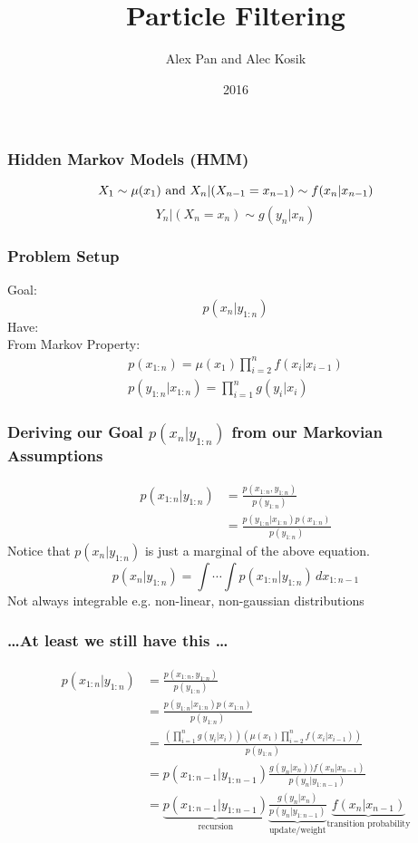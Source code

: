 \documentclass{beamer}
\title{Particle Filtering}
\author{Alex Pan and Alec Kosik}
\institute{Reed College}
\date{2016}
\begin{document}
\frame{\titlepage}

\begin{frame}
\frametitle{Hidden Markov Models (HMM)}
{\large
\begin{equation*}
X_1 \sim \mu (x_1) \textnormal{ and } X_n|(X_{n-1}=x_{n-1}) \sim f(x_n|x_{n-1})
\end{equation*}
\begin{equation*}
Y_n|(X_n = x_n) \sim g(y_n|x_n)
\end{equation*}
}
\end{frame}

\begin{frame}
\frametitle{Problem Setup}
{\Large Goal:}
\begin{equation*}
p(x_{n}|y_{1:n})
\end{equation*}
{\Large Have:} \\[.5cm]
{\large From Markov Property:}
\begin{gather*}
p(x_{1:n}) = \mu(x_1)\prod_{i=2}^{n} f(x_i|x_{i-1})\\
p(y_{1:n}|x_{1:n}) = \prod_{i=1}^{n} g(y_i|x_i)
\end{gather*}
\end{frame}

\begin{frame}
\frametitle{Deriving our Goal $p(x_n|y_{1:n})$ from our Markovian Assumptions}
\begin{align*}
p(x_{1:n}|y_{1:n}) &= \frac{p(x_{1:n}, y_{1:n})}{p(y_{1:n})} \\
&= \frac{p(y_{1:n}|x_{1:n})p(x_{1:n})}{p(y_{1:n})}
\end{align*}
{\large Notice that $p(x_n|y_{1:n})$ is just a marginal of the above equation.}
\begin{equation*}
p(x_n|y_{1:n}) = \int \cdots \int p(x_{1:n}|y_{1:n}) \,dx_{1:n-1}
\end{equation*}
{\large Not always integrable e.g. non-linear, non-gaussian distributions}
\end{frame}

\begin{frame}
\frametitle{\dots At least we still have this \dots}
\begin{align*}
p(x_{1:n}|y_{1:n}) &= \frac{p(x_{1:n}, y_{1:n})}{p(y_{1:n})} \\
&= \frac{p(y_{1:n}|x_{1:n})p(x_{1:n})}{p(y_{1:n})} \\
&= \frac{(\prod_{i=1}^{n} g(y_i|x_i))(\mu(x_1)\prod_{i=2}^{n} f(x_i|x_{i-1}))}{p(y_{1:n})} \\
&= p(x_{1:n-1}|y_{1:n-1})\frac{g(y_n|x_n))f(x_n|x_{n-1})}{p(y_n|y_{1:n-1})} \\
&= \underbrace{p(x_{1:n-1}|y_{1:n-1})}_{\text{recursion}} \underbrace{\frac{g(y_n|x_n)}{p(y_n|y_{1:n-1})}}_{\text{update/weight}} \underbrace{f(x_n|x_{n-1})}_{\text{transition probability}}
\end{align*}
\end{frame}
\end{document}
